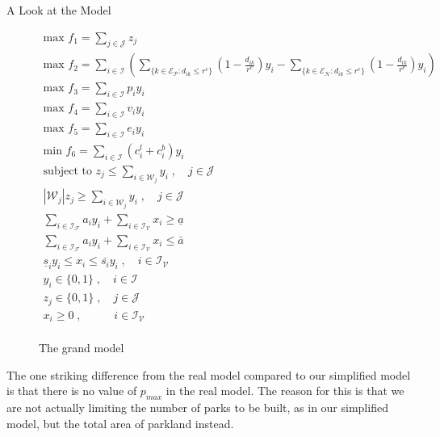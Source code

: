 \documentclass[12pt]{pom_thesis}
\theoremstyle{definition}
\begin{document}
\begin{chapter}{A Look at the Model}
\begin{figure}
\begin{gather*}
\textrm{max } f_1 = \sum_{j \in \mathcal{J}} z_j \\
\textrm{max } f_2 = \sum_{i \in \mathcal{I}}  \left( \sum_{\{k \in \mathcal{E_P}: d_{ik} \leq r^e  \}} \left( 1-\frac{d_{ik}}{r^e} \right) y_i  -   \sum_{\{k \in \mathcal{E_N}: d_{ik} \leq r^e  \}} \left( 1-\frac{d_{ik}}{r^e} \right) y_i   \right) \\
\textrm{max } f_3 = \sum_{i \in \mathcal{I}} p_iy_i \\
\textrm{max } f_4 = \sum_{i \in \mathcal{I}} v_iy_i \\
\textrm{max } f_5 = \sum_{i \in \mathcal{I}} e_iy_i \\
\textrm{min } f_6 = \sum_{i \in \mathcal{I}} (c_i^l + c_i^b)y_i \\
\textrm{subject to } z_j \leq \sum_{i \in \mathcal{W}_j} y_i \; , \quad j \in \mathcal{J} \\
\left|\mathcal{W}_j\right|z_j \geq \sum_{i \in \mathcal{W}_j} y_i \; , \quad j \in \mathcal{J} \\
\sum_{i \in \mathcal{I_F}} a_iy_i + \sum_{i \in \mathcal{I_V}} x_i \geq \underline{a} \\
\sum_{i \in \mathcal{I_F}} a_iy_i + \sum_{i \in \mathcal{I_V}} x_i \leq \bar{a} \\
\underline{s}_iy_i \leq  x_i \leq \bar{s_i}y_i \;, \quad i \in \mathcal{I_V} \\
y_i \in \{0,1\} \; , \quad i \in \mathcal{I} \\
z_j \in \{0,1\} \; , \quad j \in \mathcal{J} \\
x_i \geq 0 \; , \quad\quad\;\;\; i \in \mathcal{I_V} \\
\end{gather*}
\caption{The grand model}
\label{real-model}
\end{figure}
The one striking difference from the real model compared to our simplified model is that there is no value of $p_{max}$ in the real model. The reason for this is that we are not actually limiting the number of parks to be built, as in our simplified model, but the total area of parkland instead. 
\end{chapter}
\end{document}

